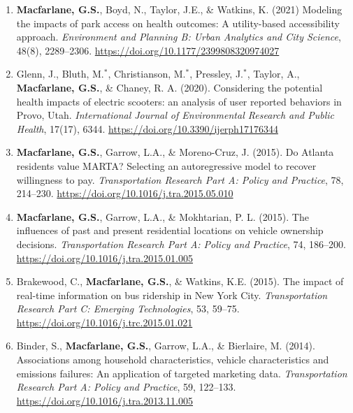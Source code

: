 \documentclass[margin,line]{res}
\newif\ifdetail{}
\newcounter{enuminitialize}
\newenvironment{myenum}[1][]
{%
 \setcounter{enuminitialize}{#1}
 \addtocounter{enuminitialize}{2}
 \begin{enumerate}[left= 4pt, itemsep=8pt, start=\value{enuminitialize}, label=\arabic*\addtocounter{enumi}{-2}]
}
{%
 \end{enumerate}
}
\begin{document}
\begin{resume}
\begin{myenum}[21]
  \item\textbf{Macfarlane, G.S.}, Boyd, N., Taylor, J.E., \& Watkins, K. (2021) Modeling the impacts of park access
on health outcomes: A utility-based accessibility approach. \textit{ Environment and
Planning B: Urban Analytics and City Science}, 48(8), 2289–2306. \url{https://doi.org/10.1177/2399808320974027}
  \ifdetail \textbf{Citations: 31}\fi

  \item Glenn, J., Bluth, M.$^*$, Christianson, M.$^*$, Pressley, J.$^*$, Taylor, A., \textbf{Macfarlane, G.S.}, \& Chaney, R. A. (2020).
  Considering the potential health impacts of electric scooters: an analysis of user reported behaviors in Provo, Utah.
  \textit{ International Journal of Environmental Research and Public Health}, 17(17), 6344. \url{https://doi.org/10.3390/ijerph17176344} 
  \ifdetail \textbf{Citations: 79}\fi

  \item\textbf{Macfarlane, G.S.}, Garrow, L.A., \& Moreno-Cruz, J. (2015). Do Atlanta
residents value MARTA? Selecting an autoregressive model to recover willingness
to pay. \textit{ Transportation Research Part A: Policy and Practice}, 78, 214–230.
\url{https://doi.org/10.1016/j.tra.2015.05.010} \ifdetail \textbf{Citations: 10} \fi

  \item\textbf{Macfarlane, G.S.}, Garrow, L.A., \& Mokhtarian, P. L. (2015). The influences of
past and present residential locations on vehicle ownership decisions.
\textit{ Transportation Research Part A: Policy and Practice}, 74, 186–200.
\url{https://doi.org/10.1016/j.tra.2015.01.005} \ifdetail \textbf{Citations: 55} \fi

  \item Brakewood, C., \textbf{Macfarlane, G.S.}, \& Watkins, K.E. (2015). The impact of
real-time information on bus ridership in New York City. \textit{ Transportation Research
Part C: Emerging Technologies}, 53, 59–75. \url{https://doi.org/10.1016/j.trc.2015.01.021} 
\ifdetail \textbf{Citations: 231} \fi

  \item Binder, S., \textbf{Macfarlane, G.S.}, Garrow, L.A., \& Bierlaire, M. (2014).
Associations among household characteristics, vehicle characteristics and
emissions failures: An application of targeted marketing data. \textit{ Transportation
Research Part A: Policy and Practice}, 59, 122–133.
\url{https://doi.org/10.1016/j.tra.2013.11.005}\ifdetail\ \textbf{Citations: 19} \fi


\end{myenum}
\end{resume}
\end{document}
